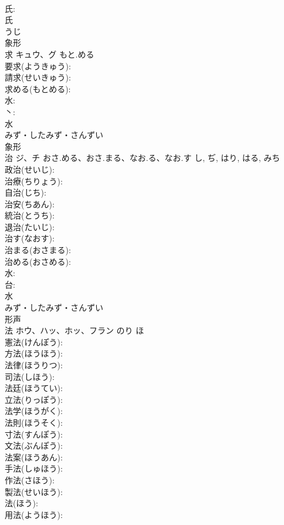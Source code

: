 \documentclass[8pt]{extreport}
\begin{document}
\begin{CJK}{UTF8}{min}
\\	氏: 
\\	氏	
\\	うじ	
\\	象形 
\\	求	キュウ、グ	もと.める		
\\	要求(ようきゅう): 
\\	請求(せいきゅう): 
\\	求める(もとめる): 
\\	水: 
\\	丶: 
\\	水	
\\	みず・したみず・さんずい	
\\	象形 
\\	治	ジ、チ	おさ.める、おさ.まる、なお.る、なお.す	し, ぢ, はり, はる, みち	
\\	政治(せいじ): 
\\	治療(ちりょう): 
\\	自治(じち): 
\\	治安(ちあん): 
\\	統治(とうち): 
\\	退治(たいじ): 
\\	治す(なおす): 
\\	治まる(おさまる): 
\\	治める(おさめる): 
\\	水: 
\\	台: 
\\	水	
\\	みず・したみず・さんずい	
\\	形声 
\\	法	ホウ、ハッ、ホッ、フラン	のり	ほ	
\\	憲法(けんぽう): 
\\	方法(ほうほう): 
\\	法律(ほうりつ): 
\\	司法(しほう): 
\\	法廷(ほうてい): 
\\	立法(りっぽう): 
\\	法学(ほうがく): 
\\	法則(ほうそく): 
\\	寸法(すんぽう): 
\\	文法(ぶんぽう): 
\\	法案(ほうあん): 
\\	手法(しゅほう): 
\\	作法(さほう): 
\\	製法(せいほう): 
\\	法(ほう): 
\\	用法(ようほう): 

\end{CJK}
\end{document}
